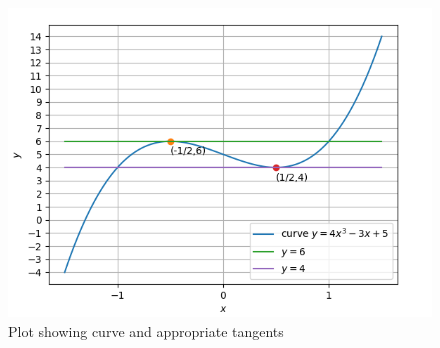 \documentclass[journal,12pt,twocolumn]{IEEEtran}
\begin{document}
\begin{flushleft}
\begin{figure}[!ht]
		\centering
		\includegraphics[width=\columnwidth]{figures/plot.png}
		\caption{Plot showing curve and appropriate tangents}
		\label{plot}
\end{figure}

\end{flushleft}
\end{document}
